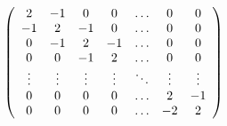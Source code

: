 \[
\left( \begin{array}{c c c c c c c} 2 & - 1 & 0 & 0 & \dots & 0 & 0 \\ - 1 & 2 & - 1 & 0 & \dots & 0 & 0 \\ 0 & - 1 & 2 & - 1 & \dots & 0 & 0 \\ 0 & 0 & - 1 & 2 & \dots & 0 & 0 \\ \vdots & \vdots & \vdots & \vdots & \ddots & \vdots & \vdots \\ 0 & 0 & 0 & 0 & \dots & 2 & - 1 \\ 0 & 0 & 0 & 0 & \dots & - 2 & 2 \end{array} \right)
\]

